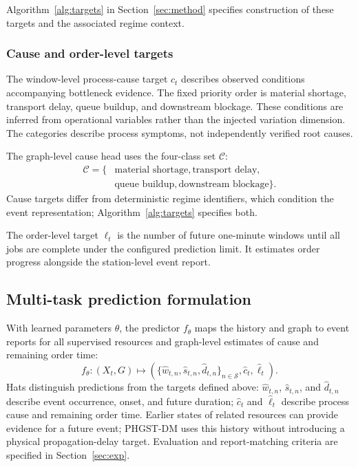 \documentclass[a4paper,fleqn]{cas-dc}
\begin{document}
Algorithm~\ref{alg:targets} in Section~\ref{sec:method} specifies construction of these targets and the associated regime context.


\subsubsection{Cause and order-level targets}

The window-level process-cause target $c_t$ describes observed conditions accompanying bottleneck evidence. The fixed priority order is material shortage, transport delay, queue buildup, and downstream blockage. These conditions are inferred from operational variables rather than the injected variation dimension. The categories describe process symptoms, not independently verified root causes.

The graph-level cause head uses the four-class set $\mathcal{C}$:
\begin{equation}
\begin{aligned}
\mathcal{C}=\{&
\text{material shortage},\text{transport delay},\\
&\text{queue buildup},\text{downstream blockage}\}.
\end{aligned}
\end{equation}
Cause targets differ from deterministic regime identifiers, which condition the event representation; Algorithm~\ref{alg:targets} specifies both.

The order-level target $\ell_t$ is the number of future one-minute windows until all jobs are complete under the configured prediction limit. It estimates order progress alongside the station-level event report.

\subsection{Multi-task prediction formulation}

With learned parameters $\theta$, the predictor $f_{\theta}$ maps the history and graph to event reports for all supervised resources and graph-level estimates of cause and remaining order time:
\begin{equation}
f_{\theta}:(X_t,G)\longmapsto
\left(
\{\hat w_{t,n},\hat s_{t,n},\hat d_{t,n}\}_{n\in\mathcal{S}},
\hat c_t,\hat\ell_t
\right).
\end{equation}
Hats distinguish predictions from the targets defined above: $\hat w_{t,n}$, $\hat s_{t,n}$, and $\hat d_{t,n}$ describe event occurrence, onset, and future duration; $\hat c_t$ and $\hat\ell_t$ describe process cause and remaining order time. Earlier states of related resources can provide evidence for a future event; PHGST-DM uses this history without introducing a physical propagation-delay target. Evaluation and report-matching criteria are specified in Section~\ref{sec:exp}.
\end{document}
